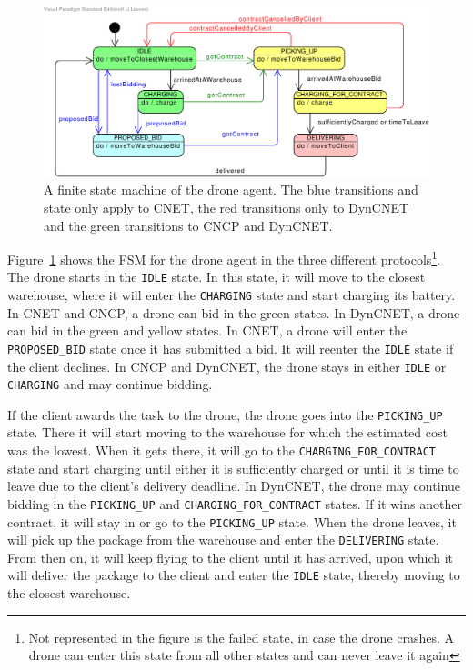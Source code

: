 \documentclass[10pt,a4paper,twocolumn]{article}
\newcommand{\commentV}[1]{\todo[inline, color=yellow]{Victor: #1}}
\begin{document}
\begin{figure}[htp]
    \centering
    \includegraphics[width=\columnwidth]{Drone}
    \caption{A finite state machine of the drone agent. The blue transitions and state only apply to CNET, the red transitions only to DynCNET and the green transitions to CNCP and DynCNET.  \commentV{te klein in twocolumn?}}
    \label{fig:droneFSM}
\end{figure}

Figure~\ref{fig:droneFSM} shows the FSM for the drone agent in the three different protocols\footnote{Not represented in the figure is the failed state, in case the drone crashes. A drone can enter this state from all other states and can never leave it again}. The drone starts in the \texttt{IDLE} state. In this state, it will move to the closest warehouse, where it will enter the \texttt{CHARGING} state and start charging its battery. In CNET and CNCP, a drone can bid in the green states. In DynCNET, a drone can bid in the green and yellow states. In CNET, a drone will enter the \texttt{PROPOSED\_BID} state once it has submitted a bid. It will reenter the \texttt{IDLE} state if the client declines. In CNCP and DynCNET, the drone stays in either \texttt{IDLE} or \texttt{CHARGING} and may continue bidding.

If the client awards the task to the drone, the drone goes into the \texttt{PICKING\_UP} state. There it will start moving to the warehouse for which the estimated cost was the lowest. When it gets there, it will go to the \texttt{CHARGING\_FOR\_CONTRACT} state and start charging until either it is sufficiently charged or until it is time to leave due to the client's delivery deadline. In DynCNET, the drone may continue bidding in the \texttt{PICKING\_UP} and \texttt{CHARGING\_FOR\_CONTRACT} states. If it wins another contract, it will stay in or go to the \texttt{PICKING\_UP} state. When the drone leaves, it will pick up the package from the warehouse and enter the \texttt{DELIVERING} state. From then on, it will keep flying to the client until it has arrived, upon which it will deliver the package to the client and enter the \texttt{IDLE} state, thereby moving to the closest warehouse.
\end{document}
